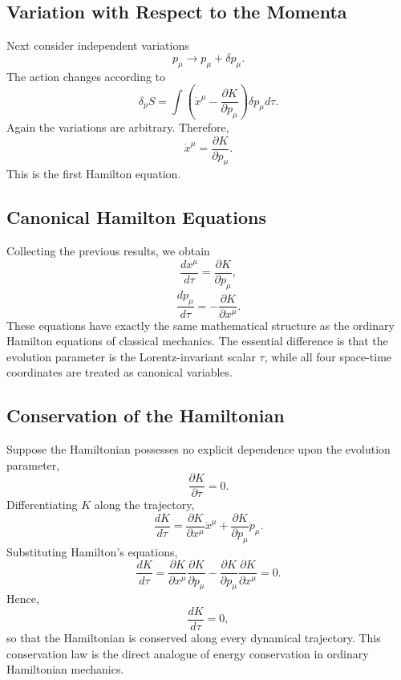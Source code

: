 \subsection{Variation with Respect to the Momenta}
Next consider independent variations
\[p_\mu\rightarrow p_\mu+\delta p_\mu .\]
The action changes according to
\[\delta_p S=\int\left(\dot x^\mu-\frac{\partial K}{\partial p_\mu}\right)
\delta p_\mu d\tau .\]
Again the variations are arbitrary.
Therefore,
\[\boxed{\dot x^\mu=\frac{\partial K}{\partial p_\mu}.}\]
This is the first Hamilton equation.
\subsection{Canonical Hamilton Equations}
Collecting the previous results, we obtain
\[\boxed{\frac{dx^\mu}{d\tau}=\frac{\partial K}{\partial p_\mu},}\]
\[\boxed{\frac{dp_\mu}{d\tau}=-\frac{\partial K}{\partial x^\mu}.}\]
These equations have exactly the same mathematical structure as the
ordinary Hamilton equations of classical mechanics.
The essential difference is that the evolution parameter is the
Lorentz-invariant scalar \(\tau\), while all four space-time coordinates
are treated as canonical variables.
\subsection{Conservation of the Hamiltonian}
Suppose the Hamiltonian possesses no explicit dependence upon the
evolution parameter,
\[\frac{\partial K}{\partial\tau}=0.\]
Differentiating \(K\) along the trajectory,
\[\frac{dK}{d\tau}=\frac{\partial K}{\partial x^\mu}\dot x^\mu
+\frac{\partial K}{\partial p_\mu}\dot p_\mu .\]
Substituting Hamilton's equations,
\[\frac{dK}{d\tau}=\frac{\partial K}{\partial x^\mu}
\frac{\partial K}{\partial p_\mu}-
\frac{\partial K}{\partial p_\mu}
\frac{\partial K}{\partial x^\mu}=0.\]
Hence,
\[\boxed{\frac{dK}{d\tau}=0,}\]
so that the Hamiltonian is conserved along every dynamical trajectory.
This conservation law is the direct analogue of energy conservation in
ordinary Hamiltonian mechanics.

